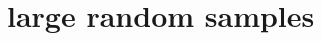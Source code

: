 \documentclass[../main.tex]{subfiles}
\begin{document}
\chapter{large random samples}

\end{document}
